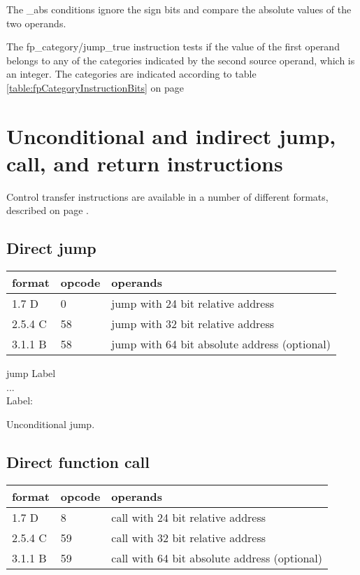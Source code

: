\documentclass[forwardcom.tex]{subfiles}
\begin{document}
The \_abs conditions ignore the sign bits and compare the absolute values of the two operands.
\vv

The fp\_category/jump\_true instruction tests if the value of the first operand belongs to any of the categories indicated by the second source operand, which is an integer. The categories are indicated according to table \ref{table:fpCategoryInstructionBits} on page \pageref{table:fpCategoryInstructionBits}
\vv


\section{Unconditional and indirect jump, call, and return instructions}
Control transfer instructions are available in a number of different formats, described on 
page \pageref{table:jumpInstructionFormats}.


\subsection{Direct jump}
\label{table:jumpInstruction}
\begin{tabular}{|p{14mm}|p{12mm}|p{110mm}|}
\hline
\bfseries format & \bfseries opcode & \bfseries operands \\ \hline
1.7 D &  0 & jump with 24 bit relative address \\ \hline
2.5.4 C & 58 & jump with 32 bit relative address \\ \hline
3.1.1 B & 58 & jump with 64 bit absolute address (optional) \\ \hline
\end{tabular}
\vv

jump Label \\
... \\
Label:
\vv

Unconditional jump.
\vv

\subsection{Direct function call}
\label{table:callInstruction}
\begin{tabular}{|p{14mm}|p{12mm}|p{110mm}|}
\hline
\bfseries format & \bfseries opcode & \bfseries operands \\ \hline
1.7 D &  8 & call with 24 bit relative address \\ \hline
2.5.4 C & 59 & call with 32 bit relative address \\ \hline
3.1.1 B & 59 & call with 64 bit absolute address (optional) \\ \hline
\end{tabular}
\vv
\end{document}
